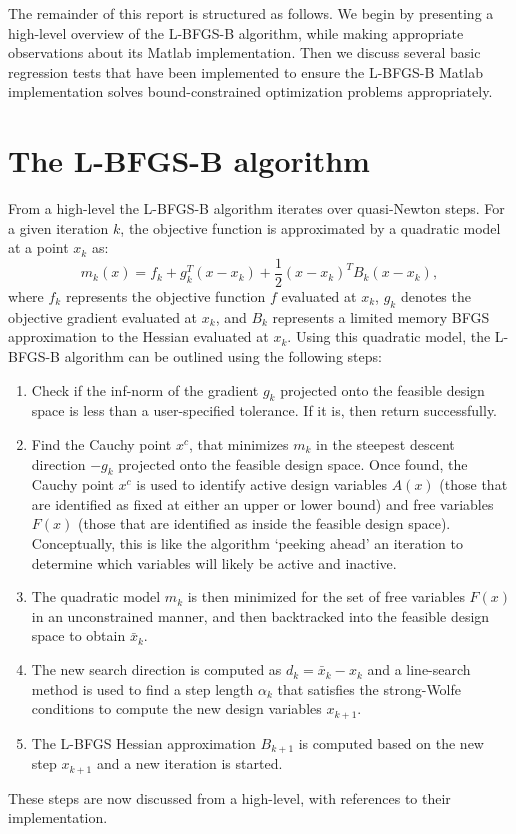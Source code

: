 \documentclass[11pt]{article}
\begin{document}
The remainder of this report is structured as follows.
We begin by presenting a high-level overview of the
L-BFGS-B algorithm, while making appropriate observations
about its Matlab implementation. Then we discuss several
basic regression tests that have been implemented to
ensure the L-BFGS-B Matlab implementation solves
bound-constrained optimization problems appropriately.

\section{The L-BFGS-B algorithm}

From a high-level the L-BFGS-B algorithm iterates over
quasi-Newton steps. For a given iteration $k$,
the objective function is approximated by a quadratic model
at a point $x_k$ as:
%
\begin{equation}
m_k(x) = f_k + g^T_k(x-x_k) + \frac12 (x-x_k)^T B_k (x-x_k),
\label{eq:quadratic}
\end{equation}
%
where $f_k$ represents the objective function $f$ evaluated
at $x_k$, $g_k$ denotes the objective gradient evaluated at
$x_k$, and $B_k$ represents a limited memory BFGS approximation
to the Hessian evaluated at $x_k$. Using this quadratic model,
the L-BFGS-B algorithm can be outlined using the following steps:
%
\begin{enumerate}
\item Check if the inf-norm of the gradient $g_k$ projected onto
the feasible design space is less than a user-specified tolerance.
If it is, then return successfully.
\item Find the Cauchy point $x^c$, that minimizes $m_k$ in
the  steepest descent direction $-g_k$ projected onto the
feasible design space. Once found, the Cauchy point $x^c$
is used to identify active design variables $A(x)$ (those that
are identified as fixed at either an upper or lower bound)
and free variables $F(x)$ (those that are identified as inside the
feasible design space). Conceptually, this is like the algorithm
`peeking ahead' an iteration to determine which variables will
likely be active and inactive.
\item The quadratic model $m_k$ is then minimized for the set
of free variables $F(x)$ in an unconstrained manner, and then
backtracked into the feasible design space to obtain
$\bar{x}_k$.
\item The new search direction is computed as $d_k = \bar{x}_k - x_k$
and a line-search method is used to find a step length $\alpha_k$
that satisfies the strong-Wolfe conditions to compute the new
design variables $x_{k+1}$.
\item The L-BFGS Hessian approximation $B_{k+1}$ is computed based
on the new step $x_{k+1}$ and a new iteration is started.
\end{enumerate}
%
These steps are now discussed from a high-level, with references
to their implementation.
\end{document}
